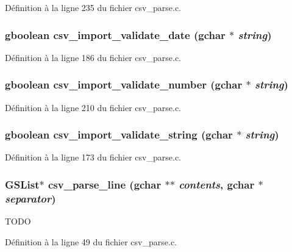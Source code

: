 Définition à la ligne 235 du fichier csv\_\-parse.c.

\subsubsection[{csv\_\-import\_\-validate\_\-date}]{\setlength{\rightskip}{0pt plus 5cm}gboolean csv\_\-import\_\-validate\_\-date (gchar $\ast$ {\em string})}\label{csv__parse_8h_af4d607fcfbc216878fc8591033bb0f2f}


Définition à la ligne 186 du fichier csv\_\-parse.c.

\subsubsection[{csv\_\-import\_\-validate\_\-number}]{\setlength{\rightskip}{0pt plus 5cm}gboolean csv\_\-import\_\-validate\_\-number (gchar $\ast$ {\em string})}\label{csv__parse_8h_a55d8803bfc38b12d081836d7a6bd00ee}


Définition à la ligne 210 du fichier csv\_\-parse.c.

\subsubsection[{csv\_\-import\_\-validate\_\-string}]{\setlength{\rightskip}{0pt plus 5cm}gboolean csv\_\-import\_\-validate\_\-string (gchar $\ast$ {\em string})}\label{csv__parse_8h_a5585e5ea29132606796d284a460945f9}


Définition à la ligne 173 du fichier csv\_\-parse.c.

\subsubsection[{csv\_\-parse\_\-line}]{\setlength{\rightskip}{0pt plus 5cm}GSList$\ast$ csv\_\-parse\_\-line (gchar $\ast$$\ast$ {\em contents}, \/  gchar $\ast$ {\em separator})}\label{csv__parse_8h_a4e3f7a27110b27f240d95aebd8ec469c}
TODO 

Définition à la ligne 49 du fichier csv\_\-parse.c.

